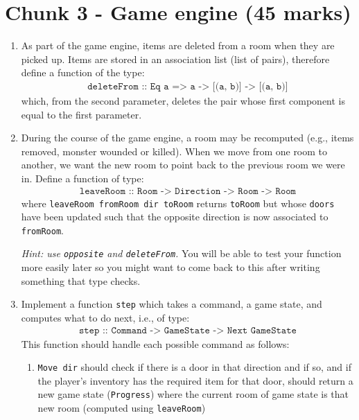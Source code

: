 \documentclass{article}
\newcommand{\topMarks}[1]{\marginnote{(#1 marks)}}
\begin{document}
\section*{Chunk 3 - Game engine (45 marks)}

\begin{enumerate}[leftmargin=1.4em,resume]

\item \topMarks{5} As part of the game engine, items are deleted from
  a room when they are picked up. Items are stored in an association
  list (list of pairs), therefore define a function of the type:
%
\begin{align*}
\texttt{deleteFrom :: Eq a => a -> [(a, b)] -> [(a, b)]}
\end{align*}
%
which, from the second parameter, deletes the pair whose first
component is equal to the first parameter.

\item \topMarks{4} During the course of the game engine, a room may
be recomputed (e.g., items removed, monster wounded
or killed). When we move from one room to another, we want
the new room to point back to the previous room we were in. Define
a function of type:
%
\begin{align*}
\texttt{leaveRoom :: Room -> Direction -> Room -> Room}
\end{align*}
%
where \texttt{leaveRoom fromRoom dir toRoom} returns \texttt{toRoom}
but whose \texttt{doors} have been updated such that the opposite
direction is now associated to \texttt{fromRoom}.

\emph{Hint: use \texttt{opposite} and
\texttt{deleteFrom}.} You will be able to test your function
more easily later so you might want to come back to this after
writing something that type checks.


\item \topMarks{15} Implement a function \texttt{step} which takes a command,
a game state, and computes what to do next, i.e., of type:
%
\begin{align*}
\texttt{step :: Command -> GameState -> Next GameState}
\end{align*}
%
This function should handle each possible
command as follows:
%
\begin{enumerate}
\item \texttt{Move dir} should check
if there is a door in that direction and if so, and if the player's
inventory has the required item for that door, should return
a new game state (\texttt{Progress}) where the current room of game
state is that new room (computed using \texttt{leaveRoom})


\end{enumerate}
\end{enumerate}
\end{document}
